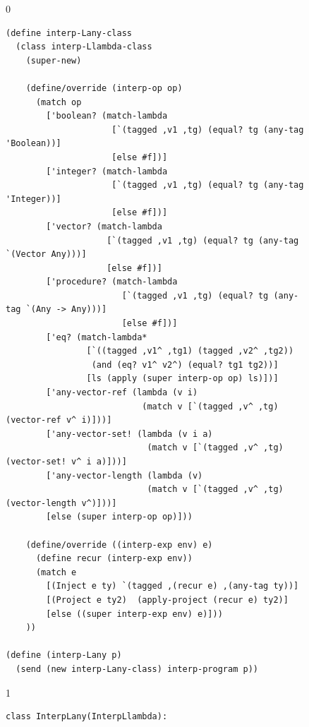 \documentclass[7x10]{TimesAPriori_MIT}%
\def\racketEd{0}
\def\pythonEd{1}
\def\edition{0}
\numberwithin{theorem}{chapter}
\numberwithin{definition}{chapter}
\numberwithin{equation}{chapter}
\begin{document}
\begin{figure}[btp]
  \begin{tcolorbox}[colback=white]
{\if\edition\racketEd
\begin{lstlisting}[basicstyle=\ttfamily\footnotesize]
(define interp-Lany-class
  (class interp-Llambda-class
    (super-new)

    (define/override (interp-op op)
      (match op
        ['boolean? (match-lambda
                     [`(tagged ,v1 ,tg) (equal? tg (any-tag 'Boolean))]
                     [else #f])]
        ['integer? (match-lambda
                     [`(tagged ,v1 ,tg) (equal? tg (any-tag 'Integer))]
                     [else #f])]
        ['vector? (match-lambda
                    [`(tagged ,v1 ,tg) (equal? tg (any-tag `(Vector Any)))]
                    [else #f])]
        ['procedure? (match-lambda
                       [`(tagged ,v1 ,tg) (equal? tg (any-tag `(Any -> Any)))]
                       [else #f])]
        ['eq? (match-lambda*
                [`((tagged ,v1^ ,tg1) (tagged ,v2^ ,tg2))
                 (and (eq? v1^ v2^) (equal? tg1 tg2))]
                [ls (apply (super interp-op op) ls)])]
        ['any-vector-ref (lambda (v i)
                           (match v [`(tagged ,v^ ,tg) (vector-ref v^ i)]))]
        ['any-vector-set! (lambda (v i a)
                            (match v [`(tagged ,v^ ,tg) (vector-set! v^ i a)]))]
        ['any-vector-length (lambda (v)
                            (match v [`(tagged ,v^ ,tg) (vector-length v^)]))]
        [else (super interp-op op)]))

    (define/override ((interp-exp env) e)
      (define recur (interp-exp env))
      (match e
        [(Inject e ty) `(tagged ,(recur e) ,(any-tag ty))]
        [(Project e ty2)  (apply-project (recur e) ty2)]
        [else ((super interp-exp env) e)]))
    ))

(define (interp-Lany p)
  (send (new interp-Lany-class) interp-program p))
\end{lstlisting}
\fi}
{\if\edition\pythonEd
\begin{lstlisting}[basicstyle=\ttfamily\footnotesize]
class InterpLany(InterpLlambda):


\end{lstlisting}}
\end{tcolorbox}
\end{figure}
\end{document}
